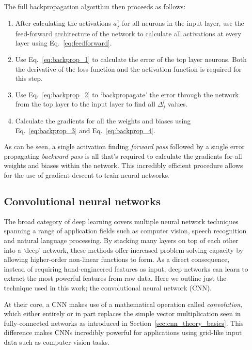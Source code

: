 The full backpropagation algorithm then proceeds as follows:
\begin{enumerate}
    \item After calculating the activations $a^{1}_{j}$ for all neurons in the input layer, use
          the feed-forward architecture of the network to calculate all activations at every layer
          using Eq.~\ref{eq:feedforward}.
    \item Use Eq.~\ref{eq:backprop_1} to calculate the error of the top layer neurons. Both the
          derivative of the loss function and the activation function is required for this step.
    \item Use Eq.~\ref{eq:backprop_2} to `backpropagate' the error through the network from the
          top layer to the input layer to find all $\Delta^{l}_{j}$ values.
    \item Calculate the gradients for all the weights and biases using Eq.~\ref{eq:backprop_3} and
          Eq.~\ref{eq:backprop_4}.
\end{enumerate}
As can be seen, a single activation finding \emph{forward pass} followed by a single error
propagating \emph{backward pass}  is all that's required to calculate the gradients for all
weights and biases within the network. This incredibly efficient procedure allows for the use of
gradient descent to train neural networks.

\subsection{Convolutional neural networks} %
\label{sec:cnn_theory_conv} %

The broad category of deep learning covers multiple neural network techniques spanning a range of
application fields such as computer vision, speech recognition and natural language processing. By
stacking many layers on top of each other into a `deep' network, these methods offer increased
problem-solving capacity by allowing higher-order non-linear functions to form. As a direct
consequence, instead of requiring hand-engineered features as input, deep networks can learn to
extract the most powerful features from raw data. Here we outline just the technique used in this
work; the convolutional neural network (CNN).

At their core, a CNN makes use of a mathematical operation called \emph{convolution}, which either
entirely or in part replaces the simple vector multiplication seen in fully-connected networks as
introduced in Section~\ref{sec:cnn_theory_basics}. This difference makes CNNs incredibly powerful
for applications using grid-like input data such as computer vision tasks.


